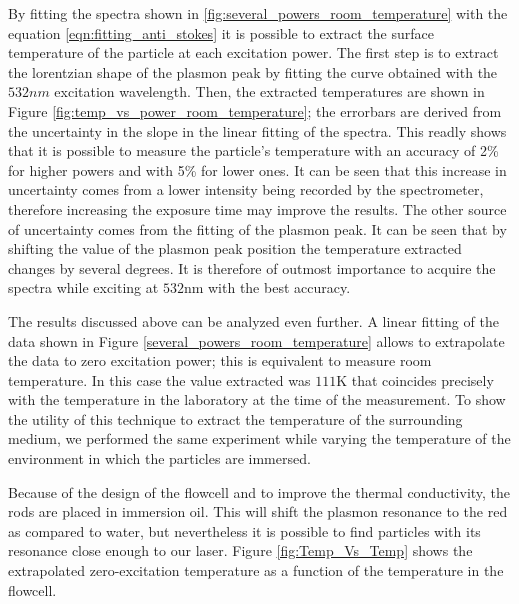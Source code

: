 \documentclass[twocolumn]{article}
\begin{document}
By fitting the spectra shown in \ref{fig:several_powers_room_temperature} with
the equation \ref{eqn:fitting_anti_stokes} it is possible to extract the surface
temperature of the particle at each excitation power. The first step is to
extract the lorentzian shape of the plasmon peak by fitting the curve obtained
with the $532nm$ excitation wavelength. Then, the extracted temperatures are
shown in Figure \ref{fig:temp_vs_power_room_temperature}; the errorbars are
derived from the uncertainty in the slope in the linear fitting of the spectra.
This readly shows that it is possible to measure the particle's temperature with
an accuracy of 2\% for higher powers and with 5\% for lower ones. It can be seen
that this increase in uncertainty comes from a lower intensity being recorded by
the spectrometer, therefore increasing the exposure time may improve the
results. The other source of uncertainty comes from the fitting of the plasmon
peak. It can be seen that by shifting the value of the plasmon peak position the
temperature extracted changes by several degrees. It is therefore of outmost
importance to acquire the spectra while exciting at $532$nm with the best
accuracy. 

The results discussed above can be analyzed even further. A linear fitting of
the data shown in Figure \ref{several_powers_room_temperature} allows to extrapolate
the data to zero excitation power; this is equivalent to measure room
temperature. In this case the value extracted was $111$K that coincides
precisely with the temperature in the laboratory at the time of the measurement.
To show the utility of this technique to extract the temperature of the
surrounding medium, we performed the same experiment while varying the
temperature of the environment in which the particles are immersed. 

Because of the design of the flowcell and to improve the thermal conductivity,
the rods are placed in immersion oil. This will shift the plasmon resonance to
the red as compared to water, but nevertheless it is possible to find particles
with its resonance close enough to our laser. Figure \ref{fig:Temp_Vs_Temp}
shows the extrapolated zero-excitation temperature as a function of the
temperature in the flowcell. 
\end{document}
